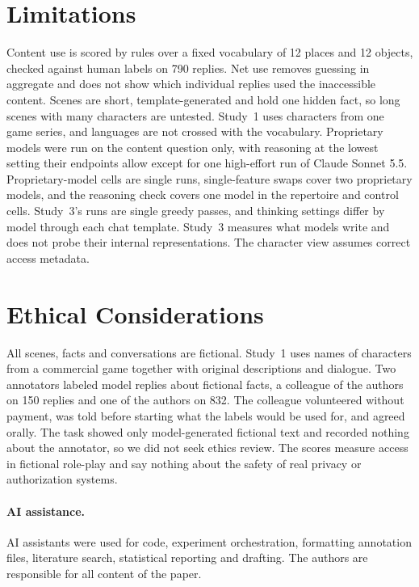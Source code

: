 \section*{Limitations}
Content use is scored by rules over a fixed vocabulary of 12 places and 12 objects, checked against human labels on 790 replies. Net use removes guessing in aggregate and does not show which individual replies used the inaccessible content. Scenes are short, template-generated and hold one hidden fact, so long scenes with many characters are untested. Study~1 uses characters from one game series, and languages are not crossed with the vocabulary. Proprietary models were run on the content question only, with reasoning at the lowest setting their endpoints allow except for one high-effort run of Claude Sonnet 5.5. Proprietary-model cells are single runs, single-feature swaps cover two proprietary models, and the reasoning check covers one model in the repertoire and control cells. Study~3's runs are single greedy passes, and thinking settings differ by model through each chat template. Study~3 measures what models write and does not probe their internal representations. The character view assumes correct access metadata.

\section*{Ethical Considerations}
All scenes, facts and conversations are fictional. Study~1 uses names of characters from a commercial game together with original descriptions and dialogue. Two annotators labeled model replies about fictional facts, a colleague of the authors on 150 replies and one of the authors on 832. The colleague volunteered without payment, was told before starting what the labels would be used for, and agreed orally. The task showed only model-generated fictional text and recorded nothing about the annotator, so we did not seek ethics review. The scores measure access in fictional role-play and say nothing about the safety of real privacy or authorization systems.
\paragraph{AI assistance.} AI assistants were used for code, experiment orchestration, formatting annotation files, literature search, statistical reporting and drafting. The authors are responsible for all content of the paper.



